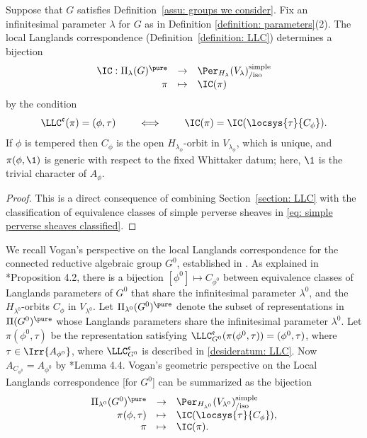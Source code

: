 \documentclass[11pt,letterpaper]{amsart}
\numberwithin{equation}{section}
\begin{document}
\begin{theorem}\label{theorem: geometric LLC}
Suppose that $G$ satisfies Definition~\ref{assu: groups we consider}.
Fix an infinitesimal parameter $\lambda$ for $G$ as in Definition \ref{definition: parameters}(2).
The local Langlands correspondence (Definition~\ref{definition: LLC}) determines a bijection
\[
\begin{array}{rcl}
\IC : 
\Pi_{\lambda}(G)^\pure &\rightarrow& \Per_{H_{\lambda}}(V_{\lambda})_{/\text{iso}}^{\text{simple}}\\
\pi &\mapsto& \IC(\pi)
\end{array}
\]
by the condition
\[
\LLC^\mathfrak{e}(\pi) = (\phi,\tau)
\qquad\iff\qquad
\IC(\pi) = \IC(\locsys{\tau}{C_\phi}).
\]
If $\phi$ is tempered then $C_\phi$ is the open $H_{\lambda_\phi}$-orbit in $V_{\lambda_\phi}$, which is unique, and $\pi(\phi,\1)$ is generic with respect to the fixed Whittaker datum; here, $\1$ is the trivial character of $A_\phi$.
\end{theorem}

\begin{proof}
This is a direct consequence of combining Section~\ref{section: LLC} with the classification of equivalence classes of simple perverse sheaves in \eqref{eq: simple perverse sheaves classified}. 
\end{proof}

We recall Vogan's perspective on the local Langlands correspondence for the connected reductive algebraic group $G^0$, established in \cite{Vog93}. As explained in \cite{CFMMX22}*{Proposition 4.2}, there is a bijection $[\phi^0] \mapsto C_{\phi^0}$ between equivalence classes of Langlands parameters of $G^0$ that share the infinitesimal parameter $\lambda^0$, and the $H_{\lambda^0}$-orbits $C_{\phi}$ in $V_{\lambda^0}$. 
Let $\Pi_{\lambda^0}(G^0)^\pure$ denote the subset of representations in $\Pi(G^0)^\pure$ whose Langlands parameters share the infinitesimal parameter $\lambda^0$. 
Let $\pi(\phi^0,\tau)$ be the representation satisfying $\LLC^{\mathfrak{e}}_{G^0}(\pi(\phi^0,\tau))=(\phi^0, \tau)$, where $\tau \in \Irr{A_{\phi^0}}$, where $\LLC_{G^0}^{\mathfrak{e}}$ is described in \ref{desideratum: LLC}. 
Now $A_{C_{\phi^0}}=A_{\phi^0}$ by
\cite{CFMMX22}*{Lemma 4.4}.
Vogan's geometric perspective on the Local Langlands correspondence [for $G^0$] can be summarized as the bijection
\[
\begin{array}{rcl}
 \Pi_{\lambda^0}(G^0)^\pure 
    &\to& \Per_{H_{\lambda^0}}(V_{\lambda^0})_{\text{/iso}}^{\text{simple}} \\
    \pi(\phi, \tau) 
    &\mapsto&
    \IC(\locsys{\tau}{C_{\phi}}), \\
    \pi &\mapsto& \IC(\pi).
\end{array}
\]
\end{document}
